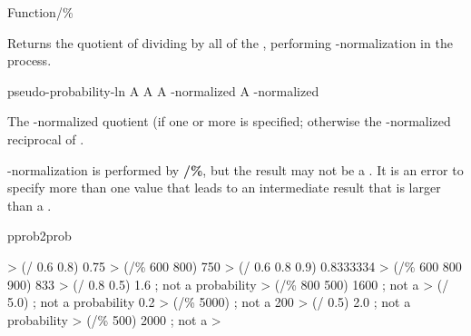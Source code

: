 \documentclass[10pt,twoside,english,pdftex]{article}
\begin{document}
\begin{functiondoc}{Function}{/\%}%
  {
    }
%

\fnsyntax
\fnalternate{\textbf{/\%}}%
  {
    \returns{} }

  \fnpurpose Returns the quotient of dividing
   by all of the
  , performing
  -normalization in the process.

\fnpackage {}

\fnmodule {}

\fnargs
\begin{args}{pseudo-probability-ln}
 A  
 A  
\arg[quotient] A -normalized 
\arg[reciprocal] A -normalized 
\end{args}

\fnreturns The -normalized
 quotient (if one or more
 is specified; otherwise the
-normalized  reciprocal
of .

\fndescription
%
-normalization is performed by \textbf{/\%}, but the
 result may not be a .
It is an error to specify more than one
 value that leads to an
intermediate result that is larger than a .

\begin{alsos}{pprob2prob}
\also[*\%]
\end{alsos}

\fnexamples
\begin{example}
%
\W\supp
  > (/ 0.6 0.8)
  0.75
  > (/\% 600 800)
  750
  > (/ 0.6 0.8 0.9)
  0.8333334
  > (/\% 600 800 900)
  833
  > (/ 0.8 0.5)
  1.6          ; not a probability
  > (/\% 800 500)
  1600         ; not a 
  > (/ 5.0)    ; not a probability
  0.2          
  > (/\% 5000)  ; not a 
  200          
  > (/ 0.5)
  2.0          ; not a probability
  > (/\% 500)
  2000         ; not a 
  > 
\end{example}

\end{functiondoc}
\end{document}
